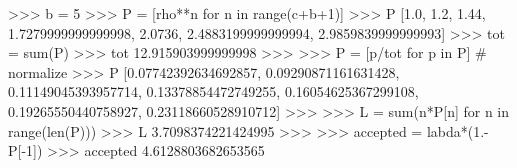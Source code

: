 
>>> b = 5
>>> P = [rho**n for n in range(c+b+1)]
>>> P
[1.0, 1.2, 1.44, 1.7279999999999998, 2.0736, 2.4883199999999994,
2.9859839999999993]
>>> tot = sum(P)
>>> tot
12.915903999999998
>>>
>>> P = [p/tot for p in P] # normalize
>>> P
[0.07742392634692857, 0.09290871161631428, 0.11149045393957714,
0.13378854472749255, 0.16054625367299108, 0.19265550440758927,
0.23118660528910712]
>>>
>>> L = sum(n*P[n] for n in range(len(P)))
>>> L
3.7098374221424995
>>>
>>> accepted = labda*(1.-P[-1])
>>> accepted
4.6128803682653565


